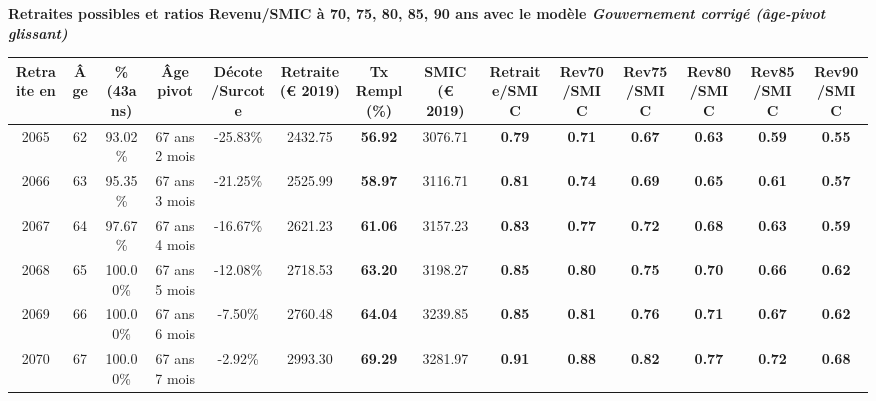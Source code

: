  \vspace{0.1cm} 
{\bf \noindent Retraites possibles et ratios Revenu/SMIC à 70, 75, 80, 85, 90 ans avec le modèle \emph{Gouvernement corrigé (âge-pivot glissant)}}  
 
\begin{adjustbox}{max width=\textwidth} 
\begin{tabular}[htb]{|c|c||c|c|c||c|c||c||c|c|c|c|c|c|} 
\hline 
 Retraite en &  Âge &  \%(43ans) &  Âge pivot &  Décote/Surcote &  Retraite (\euro{} 2019) &  Tx Rempl(\%) &  SMIC (\euro{} 2019) &  Retraite/SMIC &  Rev70/SMIC &  Rev75/SMIC &  Rev80/SMIC &  Rev85/SMIC &  Rev90/SMIC \\ 
\hline \hline 
 2065 &  62 &  93.02\% &  67 ans 2 mois &  -25.83\% &  2432.75 &  {\bf 56.92} &  3076.71 &  {\bf {\color{red} 0.79}} &  {\bf {\color{red} 0.71}} &  {\bf {\color{red} 0.67}} &  {\bf {\color{red} 0.63}} &  {\bf {\color{red} 0.59}} &  {\bf {\color{red} 0.55}} \\ 
\hline 
 2066 &  63 &  95.35\% &  67 ans 3 mois &  -21.25\% &  2525.99 &  {\bf 58.97} &  3116.71 &  {\bf {\color{red} 0.81}} &  {\bf {\color{red} 0.74}} &  {\bf {\color{red} 0.69}} &  {\bf {\color{red} 0.65}} &  {\bf {\color{red} 0.61}} &  {\bf {\color{red} 0.57}} \\ 
\hline 
 2067 &  64 &  97.67\% &  67 ans 4 mois &  -16.67\% &  2621.23 &  {\bf 61.06} &  3157.23 &  {\bf {\color{red} 0.83}} &  {\bf {\color{red} 0.77}} &  {\bf {\color{red} 0.72}} &  {\bf {\color{red} 0.68}} &  {\bf {\color{red} 0.63}} &  {\bf {\color{red} 0.59}} \\ 
\hline 
 2068 &  65 &  100.00\% &  67 ans 5 mois &  -12.08\% &  2718.53 &  {\bf 63.20} &  3198.27 &  {\bf {\color{red} 0.85}} &  {\bf {\color{red} 0.80}} &  {\bf {\color{red} 0.75}} &  {\bf {\color{red} 0.70}} &  {\bf {\color{red} 0.66}} &  {\bf {\color{red} 0.62}} \\ 
\hline 
 2069 &  66 &  100.00\% &  67 ans 6 mois &  -7.50\% &  2760.48 &  {\bf 64.04} &  3239.85 &  {\bf {\color{red} 0.85}} &  {\bf {\color{red} 0.81}} &  {\bf {\color{red} 0.76}} &  {\bf {\color{red} 0.71}} &  {\bf {\color{red} 0.67}} &  {\bf {\color{red} 0.62}} \\ 
\hline 
 2070 &  67 &  100.00\% &  67 ans 7 mois &  -2.92\% &  2993.30 &  {\bf 69.29} &  3281.97 &  {\bf {\color{red} 0.91}} &  {\bf {\color{red} 0.88}} &  {\bf {\color{red} 0.82}} &  {\bf {\color{red} 0.77}} &  {\bf {\color{red} 0.72}} &  {\bf {\color{red} 0.68}} \\ 
\hline 
\hline 
\end{tabular} 
\end{adjustbox} 
 

